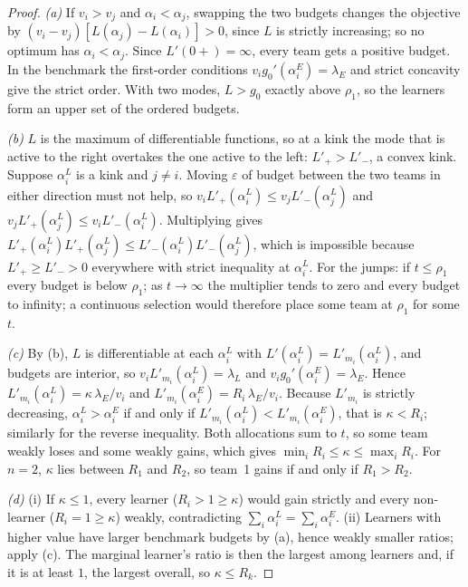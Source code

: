 \documentclass[11pt]{article}
\theoremstyle{definition}
\theoremstyle{remark}
\begin{document}
\begin{proof}
\emph{(a)} If $v_i>v_j$ and $\alpha_i<\alpha_j$, swapping the two budgets changes the objective by
$(v_i-v_j)[L(\alpha_j)-L(\alpha_i)]>0$, since $L$ is strictly increasing; so no optimum has $\alpha_i<\alpha_j$. Since $L'(0+)=\infty$,
every team gets a positive budget. In the benchmark the first-order conditions $v_ig_0'(\alpha^E_i)=\lambda_E$ and strict
concavity give the strict order. With two modes, $L>g_0$ exactly above $\rho_1$, so the learners form an upper set of
the ordered budgets.

\emph{(b)} $L$ is the maximum of differentiable functions, so at a kink the mode that is active to the right overtakes
the one active to the left: $L'_+>L'_-$, a convex kink. Suppose $\alpha^L_i$ is a kink and $j\ne i$. Moving $\varepsilon$ of budget
between the two teams in either direction must not help, so $v_iL'_+(\alpha^L_i)\le v_jL'_-(\alpha^L_j)$ and
$v_jL'_+(\alpha^L_j)\le v_iL'_-(\alpha^L_i)$. Multiplying gives $L'_+(\alpha^L_i)L'_+(\alpha^L_j)\le L'_-(\alpha^L_i)L'_-(\alpha^L_j)$, which is
impossible because $L'_+\ge L'_->0$ everywhere with strict inequality at $\alpha^L_i$. For the jumps: if $t\le\rho_1$ every
budget is below $\rho_1$; as $t\to\infty$ the multiplier tends to zero and every budget to infinity; a continuous
selection would therefore place some team at $\rho_1$ for some $t$.

\emph{(c)} By (b), $L$ is differentiable at each $\alpha^L_i$ with $L'(\alpha^L_i)=L'_{m_i}(\alpha^L_i)$, and budgets are interior, so
$v_iL'_{m_i}(\alpha^L_i)=\lambda_L$ and $v_ig_0'(\alpha^E_i)=\lambda_E$. Hence $L'_{m_i}(\alpha^L_i)=\kappa\,\lambda_E/v_i$ and
$L'_{m_i}(\alpha^E_i)=R_i\,\lambda_E/v_i$. Because $L'_{m_i}$ is strictly decreasing, $\alpha^L_i>\alpha^E_i$ if and only if
$L'_{m_i}(\alpha^L_i)<L'_{m_i}(\alpha^E_i)$, that is $\kappa<R_i$; similarly for the reverse inequality. Both allocations sum to
$t$, so some team weakly loses and some weakly gains, which gives $\min_iR_i\le\kappa\le\max_iR_i$. For $n=2$, $\kappa$ lies
between $R_1$ and $R_2$, so team~1 gains if and only if $R_1>R_2$.

\emph{(d)} (i) If $\kappa\le1$, every learner ($R_i>1\ge\kappa$) would gain strictly and every non-learner ($R_i=1\ge\kappa$)
weakly, contradicting $\sum_i\alpha^L_i=\sum_i\alpha^E_i$. (ii) Learners with higher value have larger benchmark budgets by (a),
hence weakly smaller ratios; apply (c). The marginal learner's ratio is then the largest among learners and, if it is at
least $1$, the largest overall, so $\kappa\le R_k$.
\end{proof}
\end{document}
